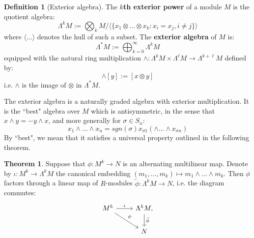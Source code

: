 \documentclass[11pt, oneside]{amsart}   	%
\theoremstyle{definition}
\newtheorem{definition}{Definition}[section]
\newtheorem{theorem}{Theorem}[section]
\begin{document}
\begin{definition}[Exterior algebra]
	The \textbf{$k$th exterior power} of a module $M$ is the quotient algebra:
	\begin{equation}
		\Lambda^k M := \bigotimes_k M / \langle\{x_1\otimes ... \otimes x_k : x_i = x_j, i\neq j\}\rangle
	\end{equation}
	where $\langle ...\rangle$ denotes the hull of such a subset. The \textbf{exterior algebra} of $M$ is:
	\begin{equation}
		\Lambda^* M :=\bigoplus_{k = 0}^\infty\Lambda^kM
	\end{equation}
	equipped with the natural ring multiplication $\wedge : \Lambda^k M\times\Lambda^\ell M\rightarrow\Lambda^{k + \ell}
	M$ defined by:
	\begin{equation}
		[x]\wedge [y] := [x\otimes y]
	\end{equation}
	i.e. $\wedge$ is the image of $\otimes$ in $\Lambda^* M$. 
\end{definition}
The exterior algebra is a naturally graded algebra with exterior multiplication. It is the ``best" algebra over $M$ which is 
antisymmetric, in the sense that $x\wedge y = - y \wedge x$, and more generally for $\sigma\in S_n$:
\begin{equation}
	x_1\wedge ...\wedge x_n = sgn(\sigma) x_{\sigma 1}(\wedge ...\wedge x_{\sigma n})
\end{equation}
By ``best", we mean that it satisfies a universal property outlined in the following theorem. 
\begin{theorem}
	Suppose that $\phi : M^k\rightarrow N$ is an alternating multilinear map. Denote by $\iota : M^k\rightarrow 
	\Lambda^k M$ the canonical embedding $(m_1, ..., m_k)\mapsto m_1\wedge ...\wedge m_k$. Then $\phi$ 
	factors through a linear map of $R$-modules $\tilde\phi : \Lambda^k M\rightarrow N$, i.e. the diagram commutes:
	\begin{equation}\begin{tikzcd}
		M^k\arrow[r, "\iota"]\arrow[dr, "\phi"] & \Lambda^k M, \arrow[d, "\tilde\phi"] \\
		& N
	\end{tikzcd}\end{equation}
\end{theorem}
\end{document}
